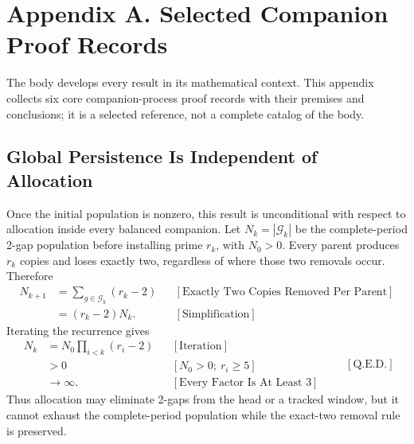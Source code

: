 \section{Appendix A. Selected Companion Proof Records}
The body develops every result in its mathematical context. This appendix collects six core companion-process proof records with their premises and conclusions; it is a selected reference, not a complete catalog of the body.
\subsection{Global Persistence Is Independent of Allocation}
Once the initial population is nonzero, this result is unconditional with respect to allocation inside every balanced companion. Let $N_k=|\mathcal G_k|$ be the complete-period 2-gap population before installing prime $r_k$, with $N_0>0$. Every parent produces $r_k$ copies and loses exactly two, regardless of where those two removals occur. Therefore
\begin{equation*}
\begin{aligned}
N_{k+1}
&=\sum_{g\in\mathcal G_k}(r_k-2)
&&[\text{Exactly Two Copies Removed Per Parent}]\\
&=(r_k-2)N_k.
&&[\text{Simplification}]
\end{aligned}
\end{equation*}
Iterating the recurrence gives
\begin{equation*}
\begin{aligned}
N_k
&=N_0\prod_{i < k}(r_i-2)
&&[\text{Iteration}]\\
&>0
&&[N_0>0;\ r_i\ge5]\\
&\longrightarrow\infty.
&&[\text{Every Factor Is At Least }3]
\end{aligned}
\qquad[\text{Q.E.D.}]
\end{equation*}
Thus allocation may eliminate 2-gaps from the head or a tracked window, but it cannot exhaust the complete-period population while the exact-two removal rule is preserved.
